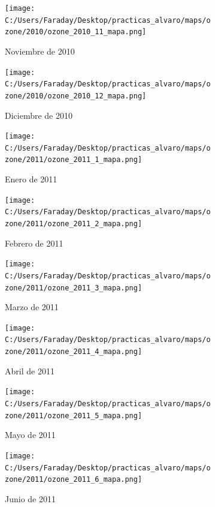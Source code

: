 \documentclass[12pt]{article}
\begin{document}
\begin{figure}[H]
\centering
\begin{subfigure}[h]{0.45\textwidth}
\texttt{[image: C:/Users/Faraday/Desktop/practicas\_alvaro/maps/ozone/2010/ozone\_2010\_11\_mapa.png]}
\caption{Noviembre de 2010}
\label{fig:map-mon-2-11-2010}
\end{subfigure}
%
\begin{subfigure}[H]{0.45\textwidth}
\texttt{[image: C:/Users/Faraday/Desktop/practicas\_alvaro/maps/ozone/2010/ozone\_2010\_12\_mapa.png]}
\caption{Diciembre de 2010}
\label{fig:map-mon-2-12-2010}
\end{subfigure}
\caption{}
\end{figure}

\newpage

\begin{figure}[H]
\centering
\begin{subfigure}[h]{0.45\textwidth}
\texttt{[image: C:/Users/Faraday/Desktop/practicas\_alvaro/maps/ozone/2011/ozone\_2011\_1\_mapa.png]}
\caption{Enero de 2011}
\label{fig:map-mon-2-1-2011}
\end{subfigure}
%
\begin{subfigure}[H]{0.45\textwidth}
\texttt{[image: C:/Users/Faraday/Desktop/practicas\_alvaro/maps/ozone/2011/ozone\_2011\_2\_mapa.png]}
\caption{Febrero de 2011}
\label{fig:map-mon-2-2-2011}
\end{subfigure}
\caption{}
\end{figure}

\begin{figure}[H]
\centering
\begin{subfigure}[h]{0.45\textwidth}
\texttt{[image: C:/Users/Faraday/Desktop/practicas\_alvaro/maps/ozone/2011/ozone\_2011\_3\_mapa.png]}
\caption{Marzo de 2011}
\label{fig:map-mon-2-3-2011}
\end{subfigure}
%
\begin{subfigure}[H]{0.45\textwidth}
\texttt{[image: C:/Users/Faraday/Desktop/practicas\_alvaro/maps/ozone/2011/ozone\_2011\_4\_mapa.png]}
\caption{Abril de 2011}
\label{fig:map-mon-2-4-2011}
\end{subfigure}
\caption{}
\end{figure}

\begin{figure}[H]
\centering
\begin{subfigure}[h]{0.45\textwidth}
\texttt{[image: C:/Users/Faraday/Desktop/practicas\_alvaro/maps/ozone/2011/ozone\_2011\_5\_mapa.png]}
\caption{Mayo de 2011}
\label{fig:map-mon-2-5-2011}
\end{subfigure}
%
\begin{subfigure}[H]{0.45\textwidth}
\texttt{[image: C:/Users/Faraday/Desktop/practicas\_alvaro/maps/ozone/2011/ozone\_2011\_6\_mapa.png]}
\caption{Junio de 2011}
\label{fig:map-mon-2-6-2011}
\end{subfigure}
\caption{}
\end{figure}
\end{document}
